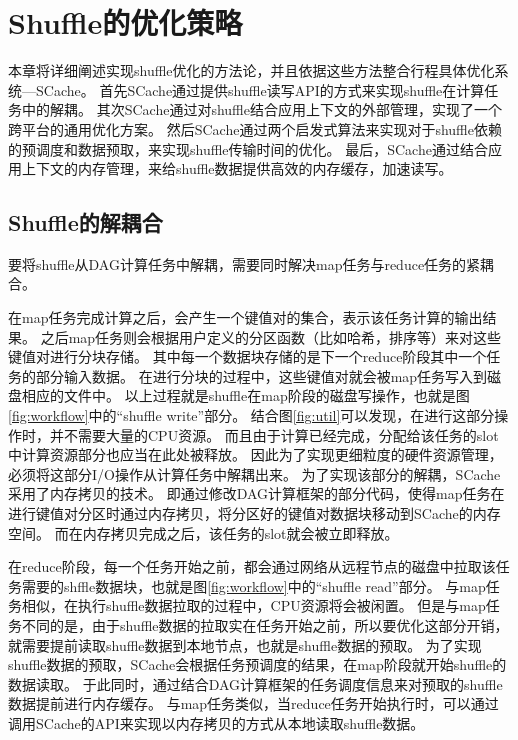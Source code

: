 
\chapter{Shuffle的优化策略}
\label{chap:optimization}

本章将详细阐述实现shuffle优化的方法论，并且依据这些方法整合行程具体优化系统---SCache。
首先SCache通过提供shuffle读写API的方式来实现shuffle在计算任务中的解耦。
其次SCache通过对shuffle结合应用上下文的外部管理，实现了一个跨平台的通用优化方案。
然后SCache通过两个启发式算法来实现对于shuffle依赖的预调度和数据预取，来实现shuffle传输时间的优化。
最后，SCache通过结合应用上下文的内存管理，来给shuffle数据提供高效的内存缓存，加速读写。

\section{Shuffle的解耦合}

要将shuffle从DAG计算任务中解耦，需要同时解决map任务与reduce任务的紧耦合。

在map任务完成计算之后，会产生一个键值对的集合，表示该任务计算的输出结果。
之后map任务则会根据用户定义的分区函数（比如哈希，排序等）来对这些键值对进行分块存储。
其中每一个数据块存储的是下一个reduce阶段其中一个任务的部分输入数据。
在进行分块的过程中，这些键值对就会被map任务写入到磁盘相应的文件中。
以上过程就是shuffle在map阶段的磁盘写操作，也就是图\ref{fig:workflow}中的“shuffle write”部分。
结合图\ref{fig:util}可以发现，在进行这部分操作时，并不需要大量的CPU资源。
而且由于计算已经完成，分配给该任务的slot中计算资源部分也应当在此处被释放。
因此为了实现更细粒度的硬件资源管理，必须将这部分I/O操作从计算任务中解耦出来。
为了实现该部分的解耦，SCache采用了内存拷贝的技术。
即通过修改DAG计算框架的部分代码，使得map任务在进行键值对分区时通过内存拷贝，将分区好的键值对数据块移动到SCache的内存空间。
而在内存拷贝完成之后，该任务的slot就会被立即释放。

在reduce阶段，每一个任务开始之前，都会通过网络从远程节点的磁盘中拉取该任务需要的shffle数据块，也就是图\ref{fig:workflow}中的“shuffle read”部分。
与map任务相似，在执行shuffle数据拉取的过程中，CPU资源将会被闲置。
但是与map任务不同的是，由于shuffle数据的拉取实在任务开始之前，所以要优化这部分开销，就需要提前读取shuffle数据到本地节点，也就是shuffle数据的预取。
为了实现shuffle数据的预取，SCache会根据任务预调度的结果，在map阶段就开始shuffle的数据读取。
于此同时，通过结合DAG计算框架的任务调度信息来对预取的shuffle数据提前进行内存缓存。
与map任务类似，当reduce任务开始执行时，可以通过调用SCache的API来实现以内存拷贝的方式从本地读取shuffle数据。

